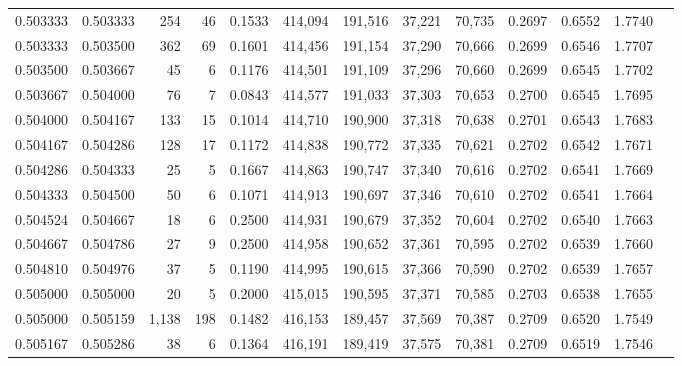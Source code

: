 \begin{tabular}{rrrrrrrrrrrrr}
0.503333 & 0.503333 &   254 &  46 &                                     0.1533 & 414,094 & 191,516 &  37,221 &  70,735 & 0.2697 & 0.6552 & 1.7740 \\
0.503333 & 0.503500 &   362 &  69 &                                     0.1601 & 414,456 & 191,154 &  37,290 &  70,666 & 0.2699 & 0.6546 & 1.7707 \\
0.503500 & 0.503667 &    45 &   6 &                                     0.1176 & 414,501 & 191,109 &  37,296 &  70,660 & 0.2699 & 0.6545 & 1.7702 \\
0.503667 & 0.504000 &    76 &   7 &                                     0.0843 & 414,577 & 191,033 &  37,303 &  70,653 & 0.2700 & 0.6545 & 1.7695 \\
0.504000 & 0.504167 &   133 &  15 &                                     0.1014 & 414,710 & 190,900 &  37,318 &  70,638 & 0.2701 & 0.6543 & 1.7683 \\
0.504167 & 0.504286 &   128 &  17 &                                     0.1172 & 414,838 & 190,772 &  37,335 &  70,621 & 0.2702 & 0.6542 & 1.7671 \\
0.504286 & 0.504333 &    25 &   5 &                                     0.1667 & 414,863 & 190,747 &  37,340 &  70,616 & 0.2702 & 0.6541 & 1.7669 \\
0.504333 & 0.504500 &    50 &   6 &                                     0.1071 & 414,913 & 190,697 &  37,346 &  70,610 & 0.2702 & 0.6541 & 1.7664 \\
0.504524 & 0.504667 &    18 &   6 &                                     0.2500 & 414,931 & 190,679 &  37,352 &  70,604 & 0.2702 & 0.6540 & 1.7663 \\
0.504667 & 0.504786 &    27 &   9 &                                     0.2500 & 414,958 & 190,652 &  37,361 &  70,595 & 0.2702 & 0.6539 & 1.7660 \\
0.504810 & 0.504976 &    37 &   5 &                                     0.1190 & 414,995 & 190,615 &  37,366 &  70,590 & 0.2702 & 0.6539 & 1.7657 \\
0.505000 & 0.505000 &    20 &   5 &                                     0.2000 & 415,015 & 190,595 &  37,371 &  70,585 & 0.2703 & 0.6538 & 1.7655 \\
0.505000 & 0.505159 & 1,138 & 198 &                                     0.1482 & 416,153 & 189,457 &  37,569 &  70,387 & 0.2709 & 0.6520 & 1.7549 \\
0.505167 & 0.505286 &    38 &   6 &                                     0.1364 & 416,191 & 189,419 &  37,575 &  70,381 & 0.2709 & 0.6519 & 1.7546 \\

\end{tabular}
